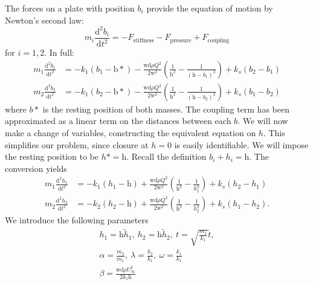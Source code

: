\documentclass{report}
\begin{document}
The forces on a plate with position $b_i$ provide the equation of motion by Newton's second law:
\begin{equation}
    m_i\frac{\mathrm{d}^2 b_i}{\mathrm{d}t^2} = -F_\mathrm{stiffness} - F_\mathrm{pressure} + F_\mathrm{coupling}
\end{equation}
for $i=1,2$. In full:
\begin{equation}
    \begin{aligned}
        m_1\frac{\mathrm{d}^2 b_1}{\mathrm{d}t^2} &= -k_1(b_1 - \mathrm{b}*) - \frac{\mathrm{wd}\rho Q^2}{2\mathrm{w}^2}\left(\frac{1}{\mathrm{h}^2} - \frac{1}{(\mathrm{h}-b_1)^2} \right) + k_s(b_2-b_1) \\
        m_2\frac{\mathrm{d}^2 b_2}{\mathrm{d}t^2} &= -k_1(b_2 - \mathrm{b}*) - \frac{\mathrm{wd}\rho Q^2}{2\mathrm{w}^2}\left(\frac{1}{\mathrm{h}^2} - \frac{1}{(\mathrm{h}-b_2)^2} \right) + k_s(b_1-b_2)
    \end{aligned}
\end{equation}
where $b*$ is the resting position of both masses.
The coupling term has been approximated as a linear term on the distances between each $b$.
We will now make a change of variables, constructing the equivalent equation on $h$.
This simplifies our problem, since closure at $h=0$ is easily identifiable.
We will impose the resting position to be $h* = \mathrm{h}$. Recall the definition $b_i + h_i = \mathrm{h}$.
The conversion yields
\begin{equation}
    \begin{aligned}
        m_1\frac{\mathrm{d}^2 h_1}{\mathrm{d}t^2} &= -k_1(h_1 - \mathrm{h}) + \frac{\mathrm{wd}\rho Q^2}{2\mathrm{w}^2}\left(\frac{1}{\mathrm{h}^2} - \frac{1}{h_1^2} \right) + k_s(h_2-h_1) \\
        m_2\frac{\mathrm{d}^2 h_2}{\mathrm{d}t^2} &= -k_2(h_2 - \mathrm{h}) + \frac{\mathrm{wd}\rho Q^2}{2\mathrm{w}^2}\left(\frac{1}{\mathrm{h}^2} - \frac{1}{h_2^2} \right) + k_s(h_1-h_2).
    \end{aligned}
\end{equation}
We introduce the following parameters
\begin{equation*}
    \begin{aligned}
        h_1 = \mathrm{h}\tilde{h}_1,~h_2 = \mathrm{h}\tilde{h}_2,~t=\sqrt{\frac{m_1}{k_1}}\tilde{t}, \\
        \alpha = \frac{m_2}{m_1},~\lambda = \frac{k_2}{k_1},~\omega = \frac{k_s}{k_1} \\
        \beta = \frac{\mathrm{wd}\rho U_\infty^2}{2k_1\mathrm{h}}
    \end{aligned}
\end{equation*}
\end{document}
